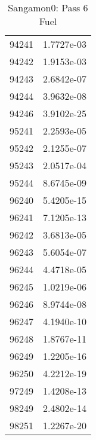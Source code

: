 \begin{table}[h!]
\begin{tabular}{|| c || c |}
94241 & 1.7727e-03 \\
94242 & 1.9153e-03 \\
94243 & 2.6842e-07 \\
94244 & 3.9632e-08 \\
94246 & 3.9102e-25 \\
95241 & 2.2593e-05 \\
95242 & 2.1255e-07 \\
95243 & 2.0517e-04 \\
95244 & 8.6745e-09 \\
96240 & 5.4205e-15 \\
96241 & 7.1205e-13 \\
96242 & 3.6813e-05 \\
96243 & 5.6054e-07 \\
96244 & 4.4718e-05 \\
96245 & 1.0219e-06 \\
96246 & 8.9744e-08 \\
96247 & 4.1940e-10 \\
96248 & 1.8767e-11 \\
96249 & 1.2205e-16 \\
96250 & 4.2212e-19 \\
97249 & 1.4208e-13 \\
98249 & 2.4802e-14 \\
98251 & 1.2267e-20 \\

\hline
\end{tabular}
\caption{Sangamon0: Pass 6 Fuel}
\label{table:sang0p6fuel}
\end{table}